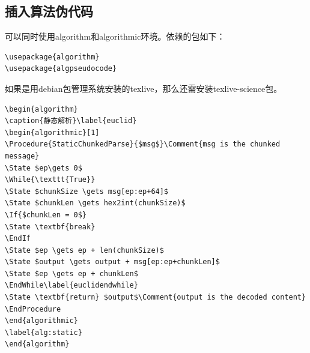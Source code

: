 \subsection{插入算法伪代码}

可以同时使用algorithm和algorithmic环境。依赖的包如下：
\begin{verbatim}
\usepackage{algorithm}
\usepackage{algpseudocode}
\end{verbatim}

如果是用debian包管理系统安装的texlive，那么还需安装texlive-science包。
\begin{verbatim}
\begin{algorithm}
\caption{静态解析}\label{euclid}
\begin{algorithmic}[1]
\Procedure{StaticChunkedParse}{$msg$}\Comment{msg is the chunked message}
\State $ep\gets 0$
\While{\texttt{True}}
\State $chunkSize \gets msg[ep:ep+64]$
\State $chunkLen \gets hex2int(chunkSize)$
\If{$chunkLen = 0$}
\State \textbf{break}
\EndIf
\State $ep \gets ep + len(chunkSize)$
\State $output \gets output + msg[ep:ep+chunkLen]$
\State $ep \gets ep + chunkLen$
\EndWhile\label{euclidendwhile}
\State \textbf{return} $output$\Comment{output is the decoded content}
\EndProcedure
\end{algorithmic}
\label{alg:static}
\end{algorithm}
\end{verbatim}




















